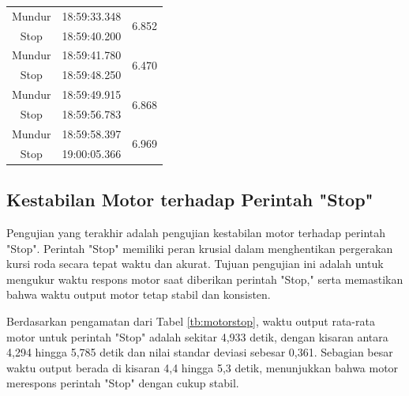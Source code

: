 \begin{longtable}{|c|c|c|}
  Mundur & 18:59:33.348 & \multirow{2}{*}{6.852} \\ \cline{1-2}
  Stop   & 18:59:40.200 &                        \\ \hline
  Mundur & 18:59:41.780 & \multirow{2}{*}{6.470} \\ \cline{1-2}
  Stop   & 18:59:48.250 &                        \\ \hline
  Mundur & 18:59:49.915 & \multirow{2}{*}{6.868} \\ \cline{1-2}
  Stop   & 18:59:56.783 &                        \\ \hline
  Mundur & 18:59:58.397 & \multirow{2}{*}{6.969} \\ \cline{1-2}
  Stop   & 19:00:05.366 &                        \\ \hline
\end{longtable}

\subsection{Kestabilan Motor terhadap Perintah "Stop"}

Pengujian yang terakhir adalah pengujian kestabilan motor terhadap perintah "Stop". Perintah "Stop" memiliki peran krusial dalam menghentikan pergerakan kursi roda secara tepat waktu dan akurat. Tujuan pengujian ini adalah untuk mengukur waktu respons motor saat diberikan perintah "Stop," serta memastikan bahwa waktu output motor tetap stabil dan konsisten.

Berdasarkan pengamatan dari Tabel \ref{tb:motorstop}, waktu output rata-rata motor untuk perintah "Stop" adalah sekitar 4,933 detik, dengan kisaran antara 4,294 hingga 5,785 detik dan nilai standar deviasi sebesar 0,361. Sebagian besar waktu output berada di kisaran 4,4 hingga 5,3 detik, menunjukkan bahwa motor merespons perintah "Stop" dengan cukup stabil.

